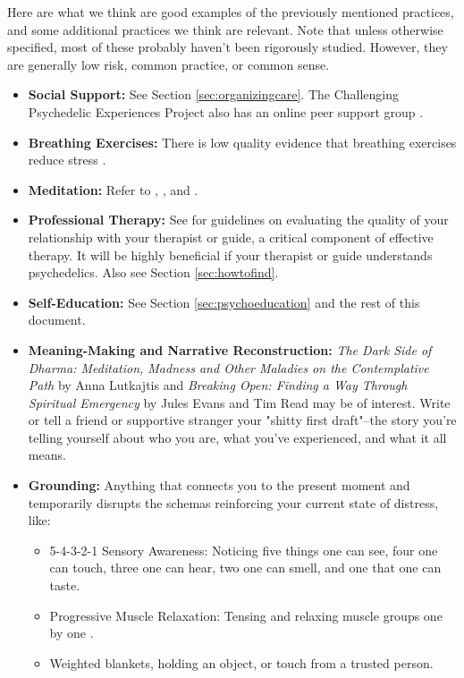 \documentclass[12pt,letterpaper]{book}
\begin{document}
Here are what we think are good examples of the previously mentioned practices, and some additional practices we think are relevant. Note that unless otherwise specified, most of these probably haven't been rigorously studied. However, they are generally low risk, common practice, or common sense. 
\begin{itemize}
    \item \textbf{Social Support:} See Section \ref{sec:organizingcare}. The Challenging Psychedelic Experiences Project also has an online peer support group \cite{peersupportgroup}.
    \item \textbf{Breathing Exercises:} There is low quality evidence that breathing exercises reduce stress \cite{fincham2023breathwork}.
    \item \textbf{Meditation:} Refer to \textcite{rain}, \textcite{bodyscan}, and \textcite{lkMeditation}.
    \item \textbf{Professional Therapy:} See \textcite{BRWAIdownload} for guidelines on evaluating the quality of your relationship with your therapist or guide, a critical component of effective therapy. It will be highly beneficial if your therapist or guide understands psychedelics. Also see Section \ref{sec:howtofind}.
    \item \textbf{Self-Education:} See Section \ref{sec:psychoeducation} and the rest of this document.
    \item \textbf{Meaning-Making and Narrative Reconstruction:} \textit{The Dark Side of Dharma: Meditation, Madness and Other Maladies on the Contemplative Path} by Anna Lutkajtis \cite{lutkajtis2021dark} and \textit{Breaking Open: Finding a Way Through Spiritual Emergency} by Jules Evans and Tim Read \cite{evans2020} may be of interest. Write or tell a friend or supportive stranger your "shitty first draft"–the story you're telling yourself about who you are, what you've experienced, and what it all means.
    \item \textbf{Grounding:} Anything that connects you to the present moment and temporarily disrupts the schemas reinforcing your current state of distress, like:
    \begin{itemize}
        \item 5-4-3-2-1 Sensory Awareness: Noticing five things one can see, four one can touch, three one can hear, two one can smell, and one that one can taste.
        \item Progressive Muscle Relaxation: Tensing and relaxing muscle groups one by one \cite{michiganProgressive}.
        \item Weighted blankets, holding an object, or touch from a trusted person.

\end{itemize}
\end{itemize}
\end{document}
